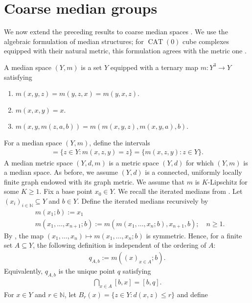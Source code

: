\documentclass[12pt,reqno]{amsart}
\newcommand{\N}{\mathbb{N}}
\newcommand{\CAT}{\operatorname{CAT}(0)}
\numberwithin{equation}{section}
\begin{document}
\section{Coarse median groups}\label{section: coarse median spaces}
We now extend the preceding results to coarse median spaces \cite{Bowditch2013coarsemedian}. We use the algebraic formulation of median structures; for $\CAT$ cube complexes equipped with their natural metric, this formulation agrees with the metric one \cite[Section 2.2]{NibloWrightZang2019fourpoint}.

A median space $(Y,m)$ is a set $Y$ equipped with a ternary map $m:Y^3\to Y$ satisfying 
\begin{enumerate}
    \item $m(x,y,z)=m(y,z,x)=m(y,x,z)$.
    \item $m(x,x,y)=x$.
    \item $m(x,y,m(z,a,b))=m(m(x,y,z),m(x,y,a),b)$.
\end{enumerate}
For a median space $(Y,m)$, define the intervals
\begin{align*}
    [x,y]=\{z\in Y: m(x,z,y)=z\}=\{m(x,z,y):z\in Y\}.
\end{align*}
A median metric space $(Y,d,m)$ is a metric space $(Y,d)$ for which $(Y,m)$ is a median space. As before, we assume $(Y,d)$ is a connected, uniformly locally finite graph endowed with its graph metric.
We assume that $m$ is $K$-Lipschitz for some $K\ge1$. Fix a base point $x_0\in Y$. We recall the iterated medians from \cite[Definition 5.1]{SpakulaWright2017propertyA}. Let $(x_i)_{i\in \N}\subseteq Y$ and $b\in Y$.
Define the iterated medians recursively by
\begin{align*}
    &m(x_1;b):=x_1\\
    &m(x_1,\ldots,x_{n+1};b):=m(m(x_1,\ldots, x_n;b),x_{n+1},b);\quad n\ge 1.
\end{align*}
By \cite[Lemma 5.2]{SpakulaWright2017propertyA}, the map $(x_1,\ldots,x_n)\mapsto m(x_1,\ldots,x_n;b)$ is symmetric. Hence, for a finite set $A\subseteq Y$, the following definition is independent of the ordering of $A$:
\begin{align*}
    q_{A,b}:=m((x)_{x\in A};b).
\end{align*}
Equivalently, $q_{A,b}$ is the unique point $q$ satisfying
\begin{align}\label{equation: q characterization as intersection}
    \bigcap_{x\in A}[b,x]=[b,q].
\end{align}
For $x\in Y$ and $r\in\N$, let $B_r(x)=\{z\in Y:d(x,z)\le r\}$ and define
\end{document}
